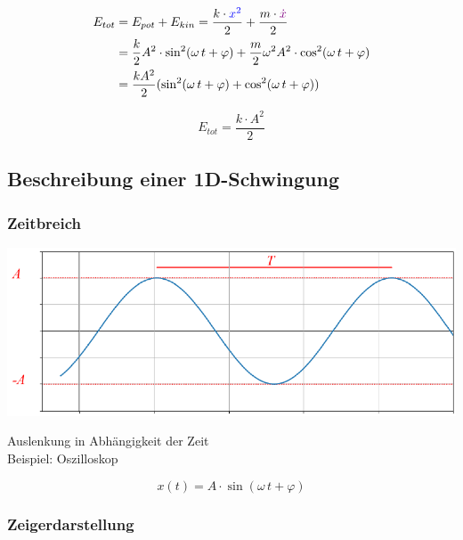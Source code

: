 \begin{align*}
E_{tot} &= E_{pot} + E_{kin} = \frac{k \cdot \textcolor{blue}{x^2} }{2} + \frac{m \cdot \textcolor{violet}{\dot{x} } }{2}   \\
&= \frac{k}{2} A^2 \cdot \sin^2(\omega \, t + \varphi) + \frac{m}{2} \omega^2  A^2 \cdot \cos^2(\omega \, t + \varphi) \\
&= \frac{k A^2}{2} ( \sin^2(\omega \, t + \varphi) + \cos^2(\omega \, t + \varphi) )
\end{align*}


$$ \boxed{ E_{tot} = \frac{k \cdot A^2}{2}  } $$






\subsection{Beschreibung einer 1D-Schwingung}

\subsubsection{Zeitbreich}

\begin{minipage}{0.38\linewidth}
\includegraphics[width=0.9\linewidth]{Bilder/Wellen-Optik/zeitbereich}
\end{minipage}
\hfill
\begin{minipage}{0.58\linewidth}
Auslenkung in Abhängigkeit der Zeit \\
Beispiel: Oszilloskop 

$$ x(t) = A \cdot \sin(\omega \, t + \varphi) $$
\end{minipage}


\subsubsection{Zeigerdarstellung}

